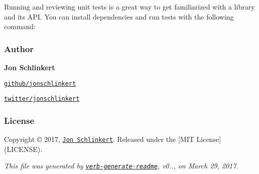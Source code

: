 Running and reviewing unit tests is a great way to get familiarized with a library and its A\+PI. You can install dependencies and run tests with the following command\+:




\subsubsection*{Author}

{\bfseries Jon Schlinkert}


\begin{DoxyItemize}
\item \href{https://github.com/jonschlinkert}{\tt github/jonschlinkert}
\item \href{https://twitter.com/jonschlinkert}{\tt twitter/jonschlinkert}
\end{DoxyItemize}

\subsubsection*{License}

Copyright © 2017, \href{https://github.com/jonschlinkert}{\tt Jon Schlinkert}. Released under the \mbox{[}M\+IT License\mbox{]}(L\+I\+C\+E\+N\+SE).





{\itshape This file was generated by \href{https://github.com/verbose/verb-generate-readme}{\tt verb-\/generate-\/readme}, v0.., on March 29, 2017.} 